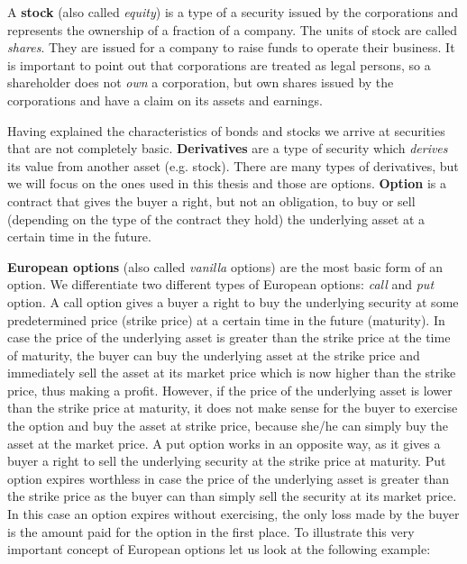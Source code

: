 \documentclass[times, utf8, diplomski]{fer}
\begin{document}
\hfill \break
\indent A \textbf{stock} (also called \textit{equity}) is a type of a security issued by the corporations and represents the ownership of a fraction of a company. The units of stock are called \textit{shares}. They are issued for a company to raise funds to operate their business. It is important to point out that corporations are treated as legal persons, so a shareholder does not \textit{own} a corporation, but own shares issued by the corporations and have a claim on its assets and earnings.

\hfill \break
\indent Having explained the characteristics of bonds and stocks we arrive at securities that are not completely basic. \textbf{Derivatives} are a type of security which \textit{derives} its value from another asset (e.g. stock). There are many types of derivatives, but we will focus on the ones used in this thesis and those are options. \textbf{Option} is a contract that gives the buyer a right, but not an obligation, to buy or sell (depending on the type of the contract they hold) the underlying asset at a certain time in the future. 

\hfill \break
\indent \textbf{European options} (also called \textit{vanilla} options) are the most basic form of an option. We differentiate two different types of European options: \textit{call} and \textit{put} option. A call option gives a buyer a right to buy the underlying security at some predetermined price (strike price) at a certain time in the future (maturity). In case the price of the underlying asset is greater than the strike price at the time of maturity, the buyer can buy the underlying asset at the strike price and immediately sell the asset at its market price which is now higher than the strike price, thus making a profit. However, if the price of the underlying asset is lower than the strike price at maturity, it does not make sense for the buyer to exercise the option and buy the asset at strike price, because she/he can simply buy the asset at the market price. A put option works in an opposite way, as it gives a buyer a right to sell the underlying security at the strike price at maturity. Put option expires worthless in case the price of the underlying asset is greater than the strike price as the buyer can than simply sell the security at its market price. In this case an option expires without exercising, the only loss made by the buyer is the amount paid for the option in the first place. To illustrate this very important concept of European options let us look at the following example:
\end{document}
